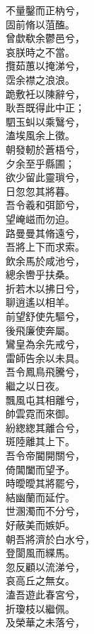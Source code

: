 \begin{pinyinscope}
\begin{shici}
不量鑿而正枘兮，\\
固前脩以菹醢。\\
曾歔欷余鬱邑兮，\\
哀朕時之不當。\\
攬茹蕙以掩涕兮，\\
霑余襟之浪浪。\\
跪敷衽以陳辭兮，\\
耿吾既得此中正；\\
駟玉虯以乘鷖兮，\\
溘埃風余上徵。\\
朝發軔於蒼梧兮，\\
夕余至乎縣圃；\\
欲少留此靈瑣兮，\\
日忽忽其將暮。\\
吾令羲和弭節兮，\\
望崦嵫而勿迫。\\
路曼曼其脩遠兮，\\
吾將上下而求索。\\
飲余馬於咸池兮，\\
總余轡乎扶桑。\\
折若木以拂日兮，\\
聊逍遙以相羊。\\
前望舒使先驅兮，\\
後飛廉使奔屬。\\
鸞皇為余先戒兮，\\
雷師告余以未具。\\
吾令鳳鳥飛騰兮，\\
繼之以日夜。\\
飄風屯其相離兮，\\
帥雲霓而來御。\\
紛緫緫其離合兮，\\
斑陸離其上下。\\
吾令帝閽開關兮，\\
倚閶闔而望予。\\
時曖曖其將罷兮，\\
結幽蘭而延佇。\\
世溷濁而不分兮，\\
好蔽美而嫉妒。\\
朝吾將濟於白水兮，\\
登閬風而緤馬。\\
忽反顧以流涕兮，\\
哀高丘之無女。\\
溘吾遊此春宮兮，\\
折瓊枝以繼佩。\\
及榮華之未落兮，\\

\end{shici}
\end{pinyinscope}
